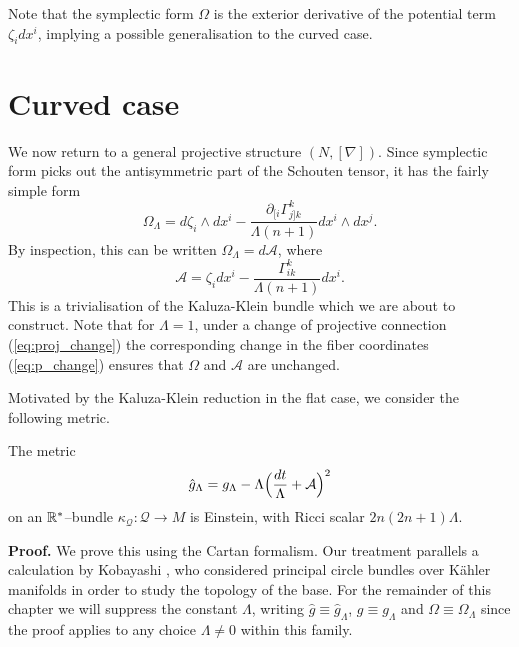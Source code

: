 Note that the symplectic form $\Omega$ is the exterior derivative
of the potential term $\zeta_{i} dx^{i}$, implying a possible
generalisation to the curved case.


\section{Curved case}

We now return to a general projective structure $(N,[\nabla])$. Since
symplectic form picks out the antisymmetric part of the Schouten tensor,
it has the fairly simple form
\[
\Omega_{\Lambda}= d\zeta_{i}\wedge dx^{i}-\frac{\partial_{[i}\Gamma_{j]k}^{k}}{\Lambda(n+1)} dx^{i}\wedge dx^{j}.
\]
By inspection, this can be written $\Omega_{\Lambda}=d\mathcal{A}$,
where
\[
\mathcal{A}=\zeta_{i} dx^{i}-\frac{\Gamma_{ik}^{k}}{\Lambda(n+1)} dx^{i}.
\]
This is a trivialisation of the Kaluza-Klein bundle which we are about
to construct. Note that for $\Lambda=1$, under a change of projective
connection (\ref{eq:proj_change}) the corresponding change in the
fiber coordinates (\ref{eq:p_change}) ensures that $\Omega$ and
$\mathcal{A}$ are unchanged.

Motivated by the Kaluza-Klein reduction in the flat case, we consider
the following metric.
\begin{theo}
The metric
\begin{equation}
\hat{g}_{\Lambda}=g_{\Lambda}-\Lambda\Bigl(\frac{ dt}{\Lambda}+\mathcal{A}\Bigr)^{2}\label{eq:G}
\end{equation}
on an $\mathbb{R}^*$--bundle $\kappa_\mathcal{Q}:\mathcal{Q}\rightarrow M$ is Einstein,
with Ricci scalar $2n(2n+1)\Lambda$.
\end{theo}
\textbf{Proof.} We prove this using the Cartan formalism. Our treatment
parallels a calculation by Kobayashi \cite{Kob}, who considered
principal circle bundles over K\"ahler manifolds in order to study the
topology of the base. For the remainder of this chapter we will suppress the constant $\Lambda$, writing $\hat{g}\equiv\hat{g}_{\Lambda}$, $g\equiv g_{\Lambda}$ and $\Omega\equiv\Omega_\Lambda$ since the proof applies to any choice $\Lambda\neq0$ within this family.

